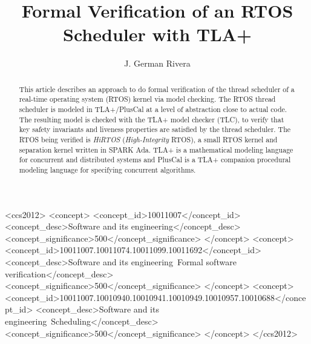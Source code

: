 \documentclass[sigplan,anonymous,10pt]{acmart}
\begin{document}
\title{Formal Verification of an RTOS Scheduler with TLA+}

\author{J. German Rivera}

\begin{abstract}
  This article describes an approach to do formal verification of the
  thread scheduler of a real-time operating system (RTOS) kernel via
  model checking. 
  The RTOS thread scheduler is modeled in TLA+/PlusCal at a level
  of abstraction close to actual code.
  The resulting model is checked with the TLA+ model checker (TLC),
  to verify that key safety invariants and liveness properties are
  satisfied by the thread scheduler.
  The RTOS being verified is \emph{HiRTOS} (\emph{High-Integrity}
  RTOS), a small RTOS kernel and separation kernel written in SPARK Ada.
  TLA+ is a mathematical modeling language for concurrent and distributed
  systems and PlusCal is a TLA+ companion procedural modeling language
  for specifying concurrent algorithms.
\end{abstract}

\begin{CCSXML}
   <ccs2012>
      <concept>
          <concept_id>10011007</concept_id>
          <concept_desc>Software and its engineering</concept_desc>
          <concept_significance>500</concept_significance>
      </concept>
      <concept>
          <concept_id>10011007.10011074.10011099.10011692</concept_id>
          <concept_desc>Software and its engineering~Formal software verification</concept_desc>
          <concept_significance>500</concept_significance>
      </concept>
      <concept>
          <concept_id>10011007.10010940.10010941.10010949.10010957.10010688</concept_id>
          <concept_desc>Software and its engineering~Scheduling</concept_desc>
          <concept_significance>500</concept_significance>
      </concept>
   </ccs2012>
\end{CCSXML}
   
\end{document}
